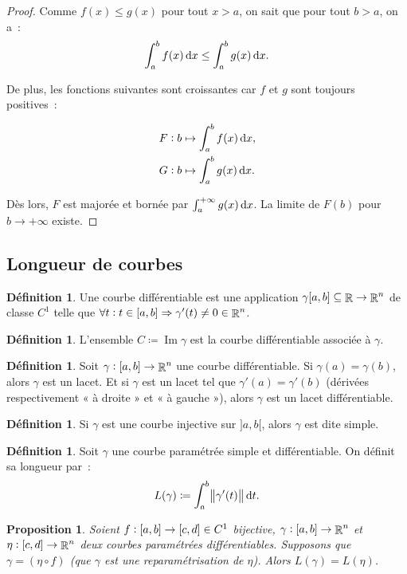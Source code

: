 \documentclass{article}
\DeclareMathOperator{\Imf}{Im}
\DeclareMathOperator{\R}{\mathbb R}
\newcommand{\ab}{\interval ab}
\newtheorem{prp}[thm]{Proposition}
\theoremstyle{definition}
\newtheorem{déf}[thm]{Définition}
\theoremstyle{remark}
\begin{document}
		\begin{proof} Comme $f(x) \leq g(x)$ pour tout $x > a$, on sait que pour tout $b > a$, on a~:
		\[\int_a^bf(x)\dif x \leq \int_a^bg(x)\dif x.\]

		De plus, les fonctions suivantes sont croissantes car $f$ et $g$ sont toujours positives~:

		\begin{align*}
			&F : b \mapsto \int_a^bf(x)\dif x, \\
			&G : b \mapsto \int_a^bg(x)\dif x.
		\end{align*}

		Dès lors, $F$ est majorée et bornée par $\int_a^{+\infty}g(x)\dif x$. La limite de $F(b)$ pour $b \to +\infty$ existe. \end{proof}

	\subsection{Longueur de courbes}
		
		\begin{déf} Une courbe différentiable est une application $\gamma \ab \subseteq \R \to \R^n$ de classe $C^1$ telle que
		$\forall t : t \in \ab \Rightarrow \gamma'(t) \neq 0 \in \R^n$. \end{déf}

		\begin{déf} L'ensemble $C \coloneqq \Imf \gamma$ est la courbe différentiable associée à $\gamma$. \end{déf}

		\begin{déf} Soit $\gamma : \ab \to \R^n$ une courbe différentiable. Si $\gamma(a) = \gamma(b)$, alors $\gamma$ est un lacet. Et si $\gamma$
		est un lacet tel que $\gamma'(a) = \gamma'(b)$ (dérivées respectivement « à droite » et « à gauche »), alors $\gamma$ est un lacet différentiable.
		\end{déf}

		\begin{déf} Si $\gamma$ est une courbe injective sur $]a, b[$, alors $\gamma$ est dite simple. \end{déf}

		\begin{déf} Soit $\gamma$ une courbe paramétrée simple et différentiable. On définit sa longueur par~:
		\[L(\gamma) \coloneqq \int_a^b\norm{\gamma'(t)}\dif t.\]
		\end{déf}

		\begin{prp} Soient $f : \ab \to \interval cd \in C^1$ bijective, $\gamma : \ab \to \R^n$ et $\eta : \interval cd \to \R^n$ deux courbes
		paramétrées différentiables. Supposons que $\gamma = (\eta \circ f)$ (que $\gamma$ est une reparamétrisation de $\eta$). Alors
		$L(\gamma) = L(\eta)$. \end{prp}
\end{document}
